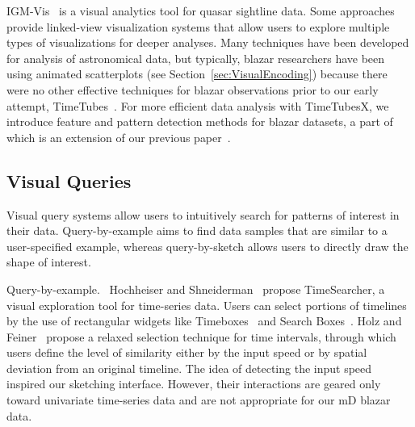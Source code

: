 IGM-Vis~\cite{Burchett2019} is a visual analytics tool for quasar sightline data.
Some approaches~\cite{Haroz2008, Li2008, Preston2016, McCurdy2019, Burchett2019} provide linked-view visualization systems that allow users to explore multiple types of visualizations for deeper analyses.
Many techniques have been developed for analysis of astronomical data, 
but typically, blazar researchers have been using animated scatterplots (see Section~\ref{sec:VisualEncoding}) 
because there were no other effective techniques for blazar observations prior to our early attempt, TimeTubes~\cite{Fujishiro2018}.
For more efficient data analysis with TimeTubesX, we introduce feature and pattern detection methods for blazar datasets, a part of which is an extension of our previous paper~\cite{Sawada2018}.

\subsection{Visual Queries}\label{sec:relatedFeature}
Visual query systems allow users to intuitively search for patterns of interest in their data.
Query-by-example aims to find data samples that are similar to a user-specified example,
whereas query-by-sketch allows users to directly draw the shape of interest.

\textsf{Query-by-example.\ }
Hochheiser and Shneiderman~\cite{Hochheiser2004} propose TimeSearcher, a visual exploration tool for time-series data. Users can select portions of timelines by the use of rectangular widgets like Timeboxes~\cite{Buono2005} and Search Boxes~\cite{Buono2008}.
Holz and Feiner~\cite{Holz2009} propose a relaxed selection technique for time intervals, through which users define the level of similarity either by the input speed or by spatial deviation from an original timeline.
The idea of detecting the input speed inspired our sketching interface.
However, their interactions are geared only toward univariate time-series data and are not appropriate for our mD blazar data.
%

